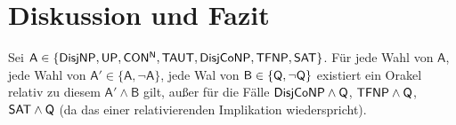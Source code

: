 \chapter{Diskussion und Fazit}\label{chap:conclusion}


\begin{corollary}
    Sei $\mathsf A \in \{\mathsf{DisjNP}, \mathsf{UP}, \mathsf{CON^{N}}, \mathsf{TAUT}, \mathsf{DisjCoNP}, \mathsf{TFNP}, \mathsf{SAT}\}$.
    Für jede Wahl von $\mathsf A$, jede Wahl von $\mathsf A' \in\{\mathsf A, \neg\mathsf A\}$, jede Wal von $\mathsf B\in \{\mathsf{Q}, \neg\mathsf{Q}\}$ existiert ein Orakel relativ zu diesem $\mathsf A'\land \mathsf B$ gilt, außer für die Fälle $\mathsf{DisjCoNP}\land\mathsf{Q}$, $\mathsf{TFNP}\land\mathsf{Q}$, $\mathsf{SAT}\land\mathsf{Q}$ (da das einer relativierenden Implikation wiederspricht).
\end{corollary}
